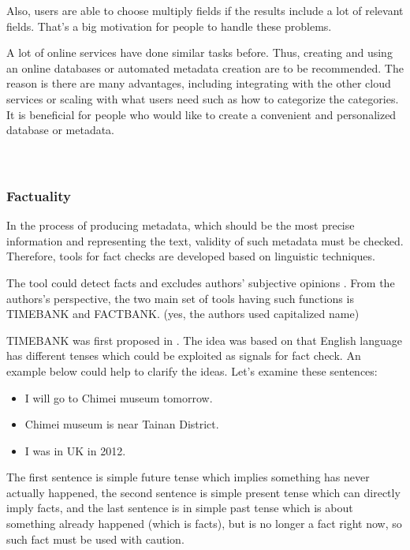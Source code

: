 Also, users are able to choose multiply fields if the results include a lot of relevant fields. 
That's a big motivation for people to handle these problems. 

A lot of online services have done similar tasks before. 
Thus, creating and using an online databases or automated metadata creation are to be recommended. 
The reason is there are many advantages, including integrating with the other cloud services or scaling with what users need such as how to categorize the categories. 
It is beneficial for people who would like to create a convenient and personalized database or metadata.\\\\\\



\subsubsection*{Factuality}

In the process of producing metadata, which should be the most precise information and representing the text, validity of such metadata must be checked. Therefore, tools for fact checks are developed based on linguistic techniques. 

The tool could detect facts and excludes authors' subjective opinions \cite{Agerri2014}. From the authors's perspective, the two main set of tools having such functions is TIMEBANK and FACTBANK. (yes, the authors used capitalized name)

TIMEBANK was first proposed in \cite{pustejovsky2003timebank}. 
The idea was based on that English language has different tenses which could be exploited as signals for fact check. 
An example below could help to clarify the ideas. Let's examine these sentences:

\begin{itemize}
	\item I will go to Chimei museum tomorrow.
	\item Chimei museum is near Tainan District.
	\item I was in UK in 2012.
\end{itemize}

The first sentence is simple future tense which implies something has never actually happened, the second sentence is simple present tense which can directly imply facts, and the last sentence is in simple past tense which is about something already happened (which is facts), but is no longer a fact right now, so such fact must be used with caution. 

